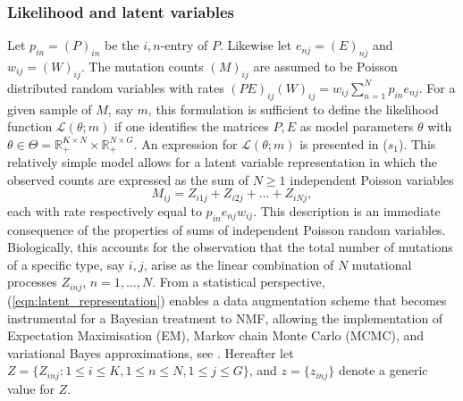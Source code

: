 \documentclass{bioinfo}
\begin{document}
\subsubsection{Likelihood and latent variables}
Let $p_{in} = (P)_{in}$ be the $i,n$-entry of $P$. Likewise let
$e_{nj} = (E)_{nj}$ and $w_{ij} = (W)_{ij}$.  The mutation counts
$(M)_{ij}$ are assumed to be Poisson distributed random variables with
rates $(PE)_{ij}(W)_{ij} = w_{ij}\sum_{n=1}^N p_{in}e_{nj}$. For a
given sample of $M$, say $m$, this formulation is sufficient to define
the likelihood function $\mathcal L(\theta; m)$ if one identifies the
matrices $P, E$ as model parameters $\theta$ with $\theta \in \Theta =
\mathbb R_+^{K\times N}\times \mathbb R_+^{N\times G}$. An expression
for $\mathcal L(\theta; m)$ is presented in ($s_1$). This relatively
simple model allows for a latent variable representation in which the
observed counts are expressed as the sum of $N\geqslant 1$ independent
Poisson variables
\begin{equation}
  \label{eqn:latent_representation}
   M_{ij} = Z_{i1j} + Z_{i2j} + \ldots + Z_{iNj},
\end{equation} 
each with rate respectively equal to $p_{in}e_{nj}w_{ij}$. This
description is an immediate consequence of the properties of sums of
independent Poisson random variables. Biologically, this accounts for
the observation that the total number of mutations of a specific type,
say $i,j$, arise as the linear combination of $N$ mutational processes
$Z_{inj}$, $n = 1, \ldots, N$. From a statistical perspective,
(\ref{eqn:latent_representation}) enables a data augmentation scheme
that becomes instrumental for a Bayesian treatment to NMF, allowing
the implementation of Expectation Maximisation (EM), Markov chain
Monte Carlo (MCMC), and variational Bayes approximations, see
\cite{C}.  Hereafter let $Z = \{Z_{inj}: 1\leqslant i\leqslant K,
1\leqslant n \leqslant N, 1\leqslant j\leqslant G\}$, and $z =
\{z_{inj}\}$ denote a generic value for $Z$.
\end{document}
